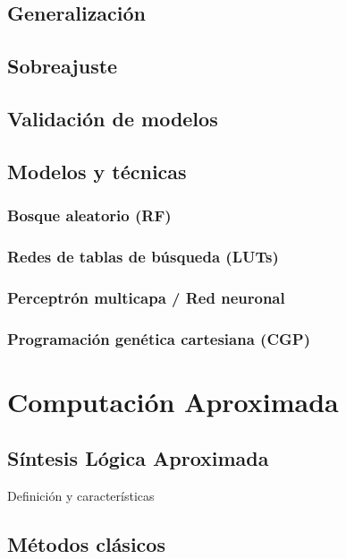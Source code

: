 \subsection{Generalización}

\subsection{Sobreajuste}

\subsection{Validación de modelos}

\subsection{Modelos y técnicas}

\subsubsection{Bosque aleatorio (RF)}

\subsubsection{Redes de tablas de búsqueda (LUTs)}

\subsubsection{Perceptrón multicapa / Red neuronal}

\subsubsection{Programación genética cartesiana (CGP)}


\section{Computación Aproximada}

\subsection{Síntesis Lógica Aproximada}

Definición y características

\subsection{Métodos clásicos}

